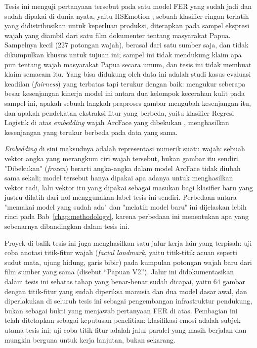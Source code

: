 Tesis ini menguji pertanyaan tersebut pada satu model FER yang sudah jadi dan sudah dipakai di dunia nyata, yaitu HSEmotion \citep{savchenko2022hsemotion}, sebuah klasifier ringan terlatih yang didistribusikan untuk keperluan produksi, diterapkan pada sampel ekspresi wajah yang diambil dari satu film dokumenter tentang masyarakat Papua. Sampelnya kecil (227 potongan wajah), berasal dari satu sumber saja, dan tidak dikumpulkan khusus untuk tujuan ini; sampel ini tidak mendukung klaim apa pun tentang wajah masyarakat Papua secara umum, dan tesis ini tidak membuat klaim semacam itu. Yang bisa didukung oleh data ini adalah studi kasus evaluasi keadilan (\textit{fairness}) yang terbatas tapi terukur dengan baik: mengukur seberapa besar kesenjangan kinerja model ini antara dua kelompok kecerahan kulit pada sampel ini, apakah sebuah langkah praproses gambar mengubah kesenjangan itu, dan apakah pendekatan ekstraksi fitur yang berbeda, yaitu klasifier Regresi Logistik di atas \textit{embedding} wajah ArcFace yang dibekukan \citep{deng2019arcface}, menghasilkan kesenjangan yang terukur berbeda pada data yang sama.

\textit{Embedding} di sini maksudnya adalah representasi numerik suatu wajah: sebuah vektor angka yang merangkum ciri wajah tersebut, bukan gambar itu sendiri. "Dibekukan" (\textit{frozen}) berarti angka-angka dalam model ArcFace tidak diubah sama sekali; model tersebut hanya dipakai apa adanya untuk menghasilkan vektor tadi, lalu vektor itu yang dipakai sebagai masukan bagi klasifier baru yang justru dilatih dari nol menggunakan label tesis ini sendiri. Perbedaan antara "memakai model yang sudah ada" dan "melatih model baru" ini dijelaskan lebih rinci pada Bab~\ref{chap:methodology}, karena perbedaan ini menentukan apa yang sebenarnya dibandingkan dalam tesis ini.

Proyek di balik tesis ini juga menghasilkan satu jalur kerja lain yang terpisah: uji coba anotasi titik-fitur wajah (\textit{facial landmark}, yaitu titik-titik acuan seperti sudut mata, ujung hidung, garis bibir) pada kumpulan potongan wajah baru dari film sumber yang sama (disebut ``Papuan V2''). Jalur ini didokumentasikan dalam tesis ini sebatas tahap yang benar-benar sudah dicapai, yaitu 64 gambar dengan titik-fitur yang sudah diperiksa manusia dan dua model dasar awal, dan diperlakukan di seluruh tesis ini sebagai pengembangan infrastruktur pendukung, bukan sebagai bukti yang menjawab pertanyaan FER di atas. Pembagian ini telah ditetapkan sebagai keputusan penelitian: klasifikasi emosi adalah subjek utama tesis ini; uji coba titik-fitur adalah jalur paralel yang masih berjalan dan mungkin berguna untuk kerja lanjutan, bukan sekarang.

